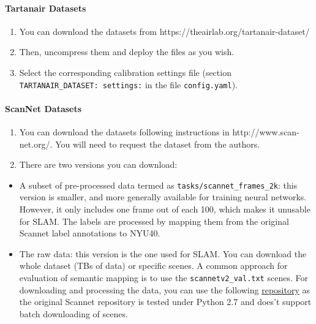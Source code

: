 \documentclass{article}
\providecommand{\tightlist}{%
  \setlength{\itemsep}{0pt}\setlength{\parskip}{0pt}}
\let\oldparagraph\paragraph
\renewcommand{\paragraph}[1]{\oldparagraph{#1}\mbox{}}
\begin{document}
\hypertarget{tartanair-datasets}{%
\paragraph{Tartanair Datasets}\label{tartanair-datasets}}

\begin{enumerate}
\def\labelenumi{\arabic{enumi}.}
\tightlist
\item
  You can download the datasets from
  https://theairlab.org/tartanair-dataset/\\
\item
  Then, uncompress them and deploy the files as you wish.
\item
  Select the corresponding calibration settings file (section
  \texttt{TARTANAIR\_DATASET:\ settings:} in the file
  \texttt{config.yaml}).
\end{enumerate}

\hypertarget{scannet-datasets}{%
\paragraph{ScanNet Datasets}\label{scannet-datasets}}

\begin{enumerate}
\def\labelenumi{\arabic{enumi}.}
\tightlist
\item
  You can download the datasets following instructions in
  http://www.scan-net.org/. You will need to request the dataset from
  the authors.
\item
  There are two versions you can download:
\end{enumerate}

\begin{itemize}
\tightlist
\item
  A subset of pre-processed data termed as
  \texttt{tasks/scannet\_frames\_2k}: this version is smaller, and more
  generally available for training neural networks. However, it only
  includes one frame out of each 100, which makes it unusable for SLAM.
  The labels are processed by mapping them from the original Scannet
  label annotations to NYU40.
\item
  The raw data: this version is the one used for SLAM. You can download
  the whole dataset (TBs of data) or specific scenes. A common approach
  for evaluation of semantic mapping is to use the
  \texttt{scannetv2\_val.txt} scenes. For downloading and processing the
  data, you can use the following
  \href{https://github.com/dvdmc/scannet-processing}{repository} as the
  original Scannet repository is tested under Python 2.7 and does't
  support batch downloading of scenes.
\end{itemize}
\end{document}
